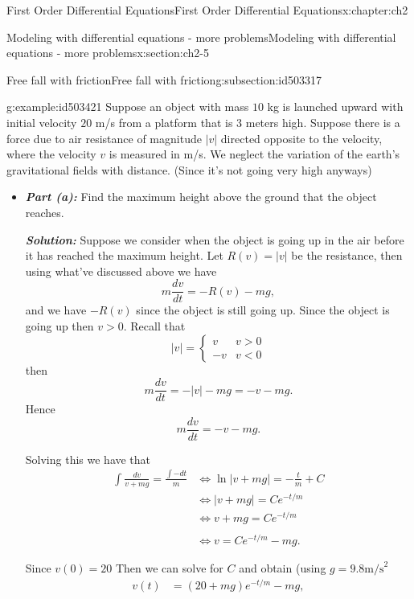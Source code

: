 \documentclass[oneside,10pt,]{book}
\newcommand{\alert}[1]{\textbf{\textit{#1}}}
\numberwithin{equation}{section}
\numberwithin{equation}{section}
\newcommand{\lt}{<}
\newcommand{\amp}{&}
\begin{document}
\begin{chapterptx}{First Order Differential Equations}{}{First Order Differential Equations}{}{}{x:chapter:ch2}
\begin{sectionptx}{Modeling with differential equations - more problems}{}{Modeling with differential equations - more problems}{}{}{x:section:ch2-5}
\begin{subsectionptx}{Free fall with friction}{}{Free fall with friction}{}{}{g:subsection:id503317}
\begin{example}{}{g:example:id503421}%
Suppose an object with mass \(10\) kg is launched upward with initial velocity \(20\) m\slash{}s from a platform that is \(3\) meters high. Suppose there is a force due to air resistance of magnitude \(\left|v\right|\) directed opposite to the velocity, where the velocity \(v\) is measured in m\slash{}s. We neglect the variation of the earth's gravitational fields with distance. (Since it's not going very high anyways)%
%
\begin{itemize}[label=\textbullet]
\item{}\alert{Part (a):} Find the maximum height above the ground that the object reaches.%
\par
\alert{Solution:} Suppose we consider when the object is going up in the air before it has reached the maximum height. Let \(R(v)=\left|v\right|\) be the resistance, then using what've discussed above we have%
\begin{equation*}
m\frac{dv}{dt}=-R(v)-mg,
\end{equation*}
and we have \(-R(v)\) since the object is still going up. Since the object is going up then \(v>0\). Recall that%
\begin{equation*}
\left|v\right|=\begin{cases}
v \amp v>0\\
-v \amp v\lt0
\end{cases}
\end{equation*}
then%
\begin{equation*}
m\frac{dv}{dt}=-\left|v\right|-mg=-v-mg.
\end{equation*}
Hence%
\begin{equation*}
m\frac{dv}{dt}=-v-mg.
\end{equation*}
%
\par
Solving this we have that%
\begin{align*}
\int\frac{dv}{v+mg}=\frac{\int-dt}{m} \amp \iff\ln\left|v+mg\right|=-\frac{t}{m}+C\\
\amp \iff\left|v+mg\right|=Ce^{-t/m}\\
\amp \iff v+mg=Ce^{-t/m}\\\\
\amp \iff v=Ce^{-t/m}-mg.
\end{align*}
%
\par
Since \(v(0)=20\) Then we can solve for \(C\) and obtain (using \(g=9.8 \text{m/s}^2\)%
\begin{align*}
v(t) \amp =\left(20+mg\right)e^{-t/m}-mg,\\

\end{align*}
\end{itemize}
\end{example}
\end{subsectionptx}
\end{sectionptx}
\end{chapterptx}
\end{document}
